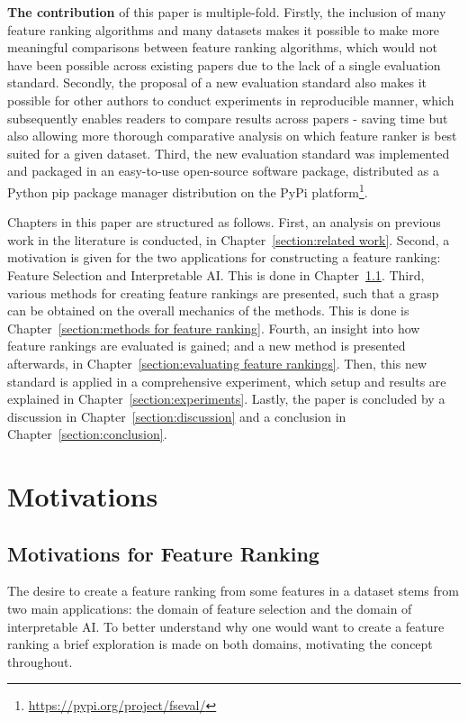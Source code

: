 \documentclass{article}
\begin{document}
\textbf{The contribution} of this paper is multiple-fold. Firstly, the inclusion of many feature ranking algorithms and many datasets makes it possible to make more meaningful comparisons between feature ranking algorithms, which would not have been possible across existing papers due to the lack of a single evaluation standard. Secondly, the proposal of a new evaluation standard also makes it possible for other authors to conduct experiments in reproducible manner, which subsequently enables readers to compare results across papers - saving time but also allowing more thorough comparative analysis on which feature ranker is best suited for a given dataset. Third, the new evaluation standard was implemented and packaged in an easy-to-use open-source software package, distributed as a Python  pip package manager distribution on the PyPi platform\footnote{\href{https://pypi.org/project/fseval/}{https://pypi.org/project/fseval/}}.

Chapters in this paper are structured as follows. First, an analysis on previous work in the literature is conducted, in Chapter~\ref{section:related work}. Second, a motivation is given for the two applications for constructing a feature ranking: Feature Selection and Interpretable AI. This is done in Chapter~\ref{section:motivations for feature ranking}. Third, various methods for creating feature rankings are presented, such that a grasp can be obtained on the overall mechanics of the methods. This is done is Chapter~\ref{section:methods for feature ranking}. Fourth, an insight into how feature rankings are evaluated is gained; and a new method is presented afterwards, in Chapter~\ref{section:evaluating feature rankings}. Then, this new standard is applied in a comprehensive experiment, which setup and results are explained in Chapter~\ref{section:experiments}. Lastly, the paper is concluded by a discussion in Chapter~\ref{section:discussion} and a conclusion in Chapter~\ref{section:conclusion}.

\section{Motivations}


\subsection{Motivations for Feature Ranking}\label{section:motivations for feature ranking}
The desire to create a feature ranking from some features in a dataset stems from two main applications: the domain of feature selection and the domain of interpretable AI. To better understand why one would want to create a feature ranking a brief exploration is made on both domains, motivating the concept throughout.
\end{document}
